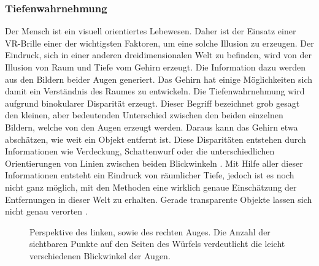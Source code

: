 \subsubsection{Tiefenwahrnehmung}


Der Mensch ist ein visuell orientiertes Lebewesen. Daher ist der Einsatz einer VR-Brille einer der wichtigsten
Faktoren, um eine solche Illusion zu erzeugen. Der Eindruck, sich in einer anderen dreidimensionalen Welt zu befinden, 
wird von der Illusion von Raum und Tiefe vom Gehirn erzeugt.
Die Information dazu werden aus den Bildern beider Augen generiert.
Das Gehirn hat einige Möglichkeiten sich damit ein Verständnis des Raumes zu entwickeln.
Die Tiefenwahrnehmung wird aufgrund binokularer Disparität erzeugt. Dieser Begriff bezeichnet grob gesagt den kleinen, aber bedeutenden
Unterschied zwischen den beiden einzelnen Bildern, welche von den Augen erzeugt werden. Daraus kann das Gehirn etwa
abschätzen, wie weit ein Objekt entfernt ist.
Diese Disparitäten entstehen durch Informationen wie Verdeckung, Schattenwurf oder die unterschiedlichen Orientierungen von Linien zwischen
beiden Blickwinkeln \parencite{Tauer2010}. Mit Hilfe aller dieser Informationen entsteht ein Eindruck von räumlicher Tiefe, 
jedoch ist es noch nicht ganz möglich, mit den Methoden eine wirklich genaue Einschätzung der Entfernungen in dieser Welt zu erhalten. 
Gerade transparente Objekte lassen sich nicht genau verorten \parencite{ElJamiy2019}.



\begin{figure}[h]
	\centering
	\begin{footnotesize}
		\caption{Perspektive des linken, sowie des rechten Auges. Die Anzahl der sichtbaren Punkte auf den Seiten des Würfels verdeutlicht die leicht verschiedenen Blickwinkel der Augen.}
	\end{footnotesize}
\end{figure}


